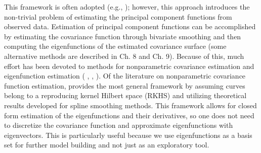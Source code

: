 This framework is often adopted (e.g., \cite{Yao:2005cv,Di:2009dz,Gromenko:2012ij}); however, 
this approach introduces the non-trivial problem of estimating the principal component functions from observed data. Estimation of principal component functions can be accomplished by estimating the covariance function through bivariate smoothing and then computing the eigenfunctions of the estimated covariance surface (some alternative methods are described in \cite{FDA} Ch. 8 and Ch. 9). Because of this, much effort has been devoted to methods for nonparametric covariance estimation and eigenfunction estimation ( \cite{Yao:2005cv}, \cite{Li:2007dn}, \cite{Cai:2010vr}).  Of the literature on nonparametric covariance function estimation, \cite{Cai:2010vr} provides the most general framework by assuming curves belong to a reproducing kernel Hilbert space (RKHS) and utilizing theoretical results developed for spline smoothing methods. This framework allows for closed form estimation of the eigenfunctions and their derivatives, so one does not need to discretize the covariance function and approximate eigenfunctions with eigenvectors.  This is particularly useful because we use eigenfunctions as a basis set for further model building and not just as an exploratory tool. 

